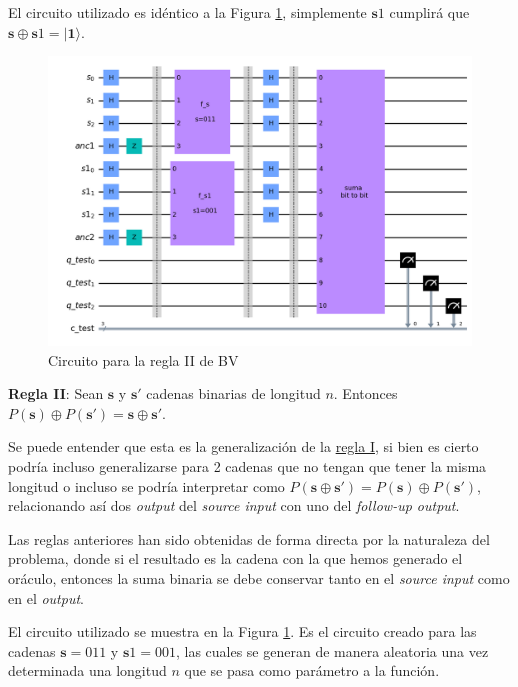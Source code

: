  El circuito utilizado es idéntico a la Figura \ref{Fig:CircuitoBVReglaII}, simplemente $\mathbf{s}1$ cumplirá que $\mathbf{s}\oplus\mathbf{s}1=|\mathbf{1}\rangle$.

\begin{figure}[H]
    \centering
    \includegraphics[width=\textwidth]{TFG/imagenes/BVReglaII.png}
    \caption{Circuito para la regla II de BV}
    \label{Fig:CircuitoBVReglaII}
 \end{figure}


\textbf{Regla II}: Sean $\mathbf{s}$ y $\mathbf{s}'$ cadenas binarias de longitud $n$. Entonces $P(\mathbf{s})\oplus P(\mathbf{s}')=\mathbf{s} \oplus \mathbf{s}'$.\newline

 Se puede entender que esta es la generalización de la \hyperref[R:BV:1]{regla I}, si bien es cierto podría incluso generalizarse para 2 cadenas que no tengan que tener la misma longitud o incluso se podría interpretar como $P(\mathbf{s} \oplus \mathbf{s}')=P(\mathbf{s})\oplus P(\mathbf{s}')$, relacionando así dos \textit{output} del \textit{source input} con uno del \textit{follow-up output}.\newline

 Las reglas anteriores han sido obtenidas de forma directa por la naturaleza del problema, donde si el resultado es la cadena con la que hemos generado el oráculo, entonces la suma binaria se debe conservar tanto en el \textit{source input} como en el \textit{output}.\newline

 El circuito utilizado se muestra en la Figura \ref{Fig:CircuitoBVReglaII}. Es el circuito creado para las cadenas $\mathbf{s}=011$ y $\mathbf{s}1=001$, las cuales se generan de manera aleatoria una vez determinada una longitud $n$ que se pasa como parámetro a la función.\newline

